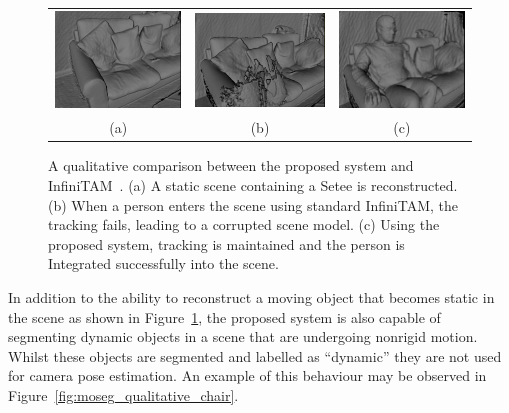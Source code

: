 \begin{figure}[h]
  \label{fig:moseg_qualitative_setee}
  \centering
  \begin{tabular}{ccc}
    \includegraphics[height=.2\linewidth]{figures/moseg/original_sitting.png} &
    \includegraphics[height=.2\linewidth]{figures/moseg/infinitam_sitting.png} &
    \includegraphics[height=.2\linewidth]{figures/moseg/moseg_sitting.png}\\
    (a) & (b) & (c)
  \end{tabular}
  \caption[Motion Segmentation Qualitative Results I]
  {A qualitative comparison between the proposed system and InfiniTAM~\cite{Prisacariu2014}.
    (a) A static scene containing a Setee is reconstructed.
    (b) When a person enters the scene using standard InfiniTAM, the tracking
    fails, leading to a corrupted scene model.
    (c) Using the proposed system, tracking is maintained and the person is
    Integrated successfully into the scene.}
\end{figure}

In addition to the ability to reconstruct a moving object that becomes static in
the scene as shown in Figure~\ref{fig:moseg_qualitative_setee}, the proposed
system is also capable of segmenting dynamic objects in a scene that are
undergoing nonrigid motion. Whilst these objects are segmented and labelled as
``dynamic'' they are not used for camera pose estimation. An example of this
behaviour may be observed in Figure~\ref{fig:moseg_qualitative_chair}.

